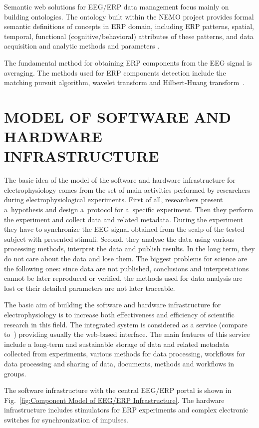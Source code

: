 \documentclass[a4paper,twoside]{article}
\begin{document}
Semantic web solutions for EEG/ERP data management focus mainly on building ontologies. The ontology built within the NEMO project provides formal semantic definitions of concepts in ERP domain, including ERP patterns, spatial, temporal, functional (cognitive/behavioral) attributes of these patterns, and data acquisition and analytic methods and parameters \cite{neuralontologies}.

The fundamental method for obtaining ERP components from the EEG signal is averaging. The methods used for ERP components detection include the matching pursuit algorithm, wavelet transform and Hilbert-Huang transform~\cite{ciniburk}.

\section{\label{Model}\uppercase{Model of software and hardware infrastructure}}

\noindent The basic idea of the model of the software and hardware infrastructure for electrophysiology comes from the set of main activities performed by researchers during electrophysiological experiments. First of all, researchers present a~hypothesis and design a~protocol for a~specific experiment. Then they perform the experiment and collect data and related metadata. During the experiment they have to synchronize the EEG signal obtained from the scalp of the tested subject with presented stimuli. Second, they analyse the data using various processing methods, interpret the data and publish results. In the long term, they do not care about the data and lose them. The biggest problems for science are the following ones: since data are not published, conclusions and interpretations cannot be later reproduced or verified, the methods used for data analysis are lost or their detailed parameters are not later traceable.

The basic aim of building the software and hardware infrastructure for electrophysiology is to increase both effectiveness and efficiency of scientific research in this field. The integrated system is considered as a service (compare to~\cite{fgibson:Watson2007}) providing usually the web-based interface. The main features of this service include a long-term and sustainable storage of data and related metadata collected from experiments, various methods for data processing, workflows for data processing and sharing of data, documents, methods and workflows in groups.

The software infrastructure with the central EEG/ERP portal is shown in Fig.~\ref{fig:Component Model of EEG/ERP Infrastructure}. The hardware infrastructure includes stimulators for ERP experiments and complex electronic switches for synchronization of impulses.
\end{document}

